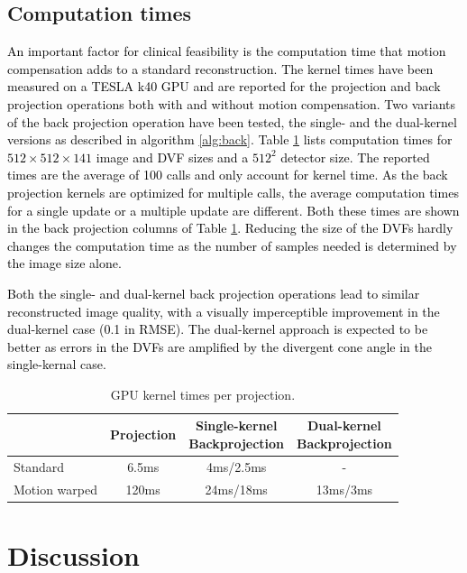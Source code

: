 \subsection{Computation times}
\textcolor{black}{An important factor for clinical feasibility is the computation time that motion compensation adds to a standard reconstruction. The kernel times have been measured on a TESLA k40 GPU and are reported for the projection and back projection operations both with and without motion compensation. Two variants of the back projection operation have been tested, the single- and the dual-kernel versions as described in algorithm \ref{alg:back}. Table \ref{tab:times} lists computation times for $512\times 512 \times 141$ image and DVF sizes and a $512^2$ detector size. The reported times are the average of 100 calls and only account for kernel time. As the back projection kernels are optimized for multiple calls, the average computation times for a single update or a multiple update are different. Both these times are shown in the back projection columns of Table \ref{tab:times}. Reducing the size of the DVFs hardly changes the computation time as the number of samples needed is determined by the image size alone.}

\textcolor{black}{Both the single- and dual-kernel back projection operations lead to similar reconstructed image quality, with a visually imperceptible improvement in the dual-kernel case (0.1 in RMSE). The dual-kernel approach is expected to be better as errors in the DVFs are amplified by the divergent cone angle in the single-kernal case.}

\begin{table}[H]
\begin{center}
\caption{GPU kernel times per projection.}
\label{tab:times}
\begin{tabular}{|l|| c | c | c |}
\hline
& Projection & \thead{Single-kernel \\Backprojection} & \thead{Dual-kernel\\ Backprojection}\\  
\hline
\hline
Standard& 6.5ms& 4ms/2.5ms&-\\   
Motion warped&120ms &24ms/18ms &13ms/3ms\\
\hline  
\end{tabular}
\end{center}
\end{table}

\section{Discussion}

